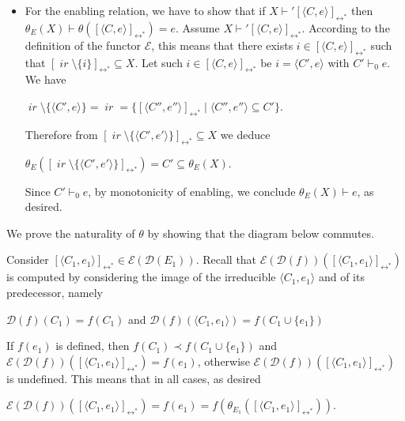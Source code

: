 \documentclass[conference]{IEEEtran}
\renewenvironment{proof}{\begin{IEEEproof}}{\end{IEEEproof}}
\newcommand{\ir}[1]{\ensuremath{\mathop{\mathit{ir}({#1})}}}
\newcommand{\esir}[2]{\ensuremath{\langle{#1}, {#2}\rangle}}
\newcommand{\eqclass}[2][]{\ensuremath{[{#2}]_{\scriptscriptstyle {#1}}}}
\newcommand{\eqclassir}[1]{\ensuremath{\eqclass[\leftrightarrow^*]{#1}}}
\newcommand{\zev}[0]{\ensuremath{\mathcal{E}}}
\newcommand{\ev}[1]{\ensuremath{\zev({#1})}}
\newcommand{\zdom}[0]{\ensuremath{\mathcal{D}}}
\newcommand{\dom}[1]{\ensuremath{\zdom({#1})}}
\begin{document}
\begin{proof}
\begin{itemize}
  \item
    For the enabling relation, we have to show that if
    $X \vdash' \eqclassir{\esir{C}{e}}$ then
    $\theta_E(X) \vdash \theta(\eqclassir{\esir{C}{e}}) = e$.
    Assume $X \vdash' \eqclassir{\esir{C}{e}}$. According to the
    definition of the functor ${\ensuremath{\mathcal{E}}}$, this means
    that there exists
    $i \in \eqclassir{\esir{C}{e}}$ such that
    ${\eqclassir{\ir{i} \setminus \{i \}} \subseteq X}$.
    Let such $i \in \eqclassir{\esir{C}{e}}$ be $i = \esir{C'}{e}$
    with $C' \vdash_0 {e}$. We have
    \begin{center}
      $\ir{\esir{C'}{e}} \setminus \{ \esir{C'}{e} \} = \ir{C'} = \{
      \eqclassir{\esir{ C''}{ e''}} \mid \esir{ C''}{ e''} \subseteq C'\}$.
    \end{center}    
    Therefore from
    $\eqclassir{\ir{\esir{C'}{e'}} \setminus \{ \esir{C'}{e'} \}} \subseteq X$
    we deduce
    \begin{center}
      $\theta_E(\eqclassir{\ir{\esir{C'}{e'}} \setminus \{ \esir{C'}{e'} \}}) = C' \subseteq \theta_E(X)$.
    \end{center}
    Since $C' \vdash_0 e$, by monotonicity of enabling, we conclude
    $\theta_E(X) \vdash e$, as desired.
  \end{itemize}

  We prove the naturality of $\theta$ by showing that the
  diagram below commutes.
  \begin{center}
  \end{center}
  Consider $\eqclassir{\esir{C_1}{e_1}} \in \ev{\dom{{E}_1}}$.
  Recall that $\ev{\dom{f}}(\eqclassir{\esir{C_1}{e_1}})$ is computed
  by considering the image of the irreducible
  $\esir{C_1}{e_1}$ and of its predecessor, namely
  \begin{center}
    $\dom{f}(C_1) = f(C_1)$ and $\dom{f}(\esir{C_1}{e_1}) = f(C_1 \cup\{e_1\})$
  \end{center}
  If $f(e_1)$ is defined, then $f(C_1) \prec f(C_1 \cup\{e_1\})$ and
  $\ev{\dom{f}}(\eqclassir{\esir{C_1}{e_1}}) = f(e_1)$, otherwise
  $\ev{\dom{f}}(\eqclassir{\esir{C_1}{e_1}})$ is undefined. This means
  that in all cases, as desired
  \begin{center}
    $\ev{\dom{f}}(\eqclassir{\esir{C_1}{e_1}}) = f(e_1) =
    f(\theta_{{E}_1}(\eqclassir{\esir{C_1}{e_1}}))$.
  \end{center}
  

\end{proof}
\end{document}
